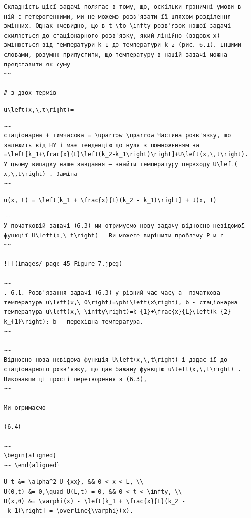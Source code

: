 \documentclass[
  ukrainian,
]{article}
\begin{document}
\begin{verbatim}
Складність цієї задачі полягає в тому, що, оскільки граничні умови в ній є гетерогенними, ми не можемо розв'язати її шляхом розділення змінних. Однак очевидно, що в t \to \infty розв'язок нашої задачі схиляється до стаціонарного розв'язку, який лінійно (вздовж x) змінюється від температури k_1 до температури k_2 (рис. 6.1). Іншими словами, розумно припустити, що температуру в нашій задачі можна представити як суму
~~

# з двох термів
\end{verbatim}

\texttt{u\textbackslash{}left(x,\textbackslash{},t\textbackslash{}right)=}

\begin{verbatim}
~~
стаціонарна + тимчасова = \uparrow \uparrow Частина розв'язку, що залежить від HY і має тенденцію до нуля з помноженням на =\left[k_1+\frac{x}{L}\left(k_2-k_1\right)\right]+U\left(x,\,t\right). У цьому випадку наше завдання — знайти температуру переходу U\left( x,\,t\right) . Заміна
~~
\end{verbatim}

\texttt{u(x,\ t)\ =\ \textbackslash{}left{[}k\_1\ +\ \textbackslash{}frac\{x\}\{L\}(k\_2\ -\ k\_1)\textbackslash{}right{]}\ +\ U(x,\ t)}

\begin{verbatim}
~~
У початковій задачі (6.3) ми отримуємо нову задачу відносно невідомої функції U\left(x,\ t\right) . Ви можете вирішити проблему Р и с
~~

![](images/_page_45_Figure_7.jpeg)

~~
. 6.1. Розв'язання задачі (6.3) у різний час часу a- початкова температура u\left(x,\ 0\right)=\phi\left(x\right); b - стаціонарна температура u\left(x,\ \infty\right)=k_{1}+\frac{x}{L}\left(k_{2}-k_{1}\right); b - перехідна температура.
~~

~~
Відносно нова невідома функція U\left(x,\,t\right) і додає її до стаціонарного розв'язку, що дає бажану функцію u\left(x,\,t\right) . Виконавши ці прості перетворення з (6.3),
~~

Ми отримаємо

(6.4)

~~
\begin{aligned}
~~ \end{aligned}
\end{verbatim}

\texttt{U\_t\ \&=\ \textbackslash{}alpha\^{}2\ U\_\{xx\},\ \&\&\ 0\ \textless{}\ x\ \textless{}\ L,\ \textbackslash{}\textbackslash{}}
\texttt{U(0,t)\ \&=\ 0,\textbackslash{}quad\ U(L,t)\ =\ 0,\ \&\&\ 0\ \textless{}\ t\ \textless{}\ \textbackslash{}infty,\ \textbackslash{}\textbackslash{}}
\texttt{U(x,0)\ \&=\ \textbackslash{}varphi(x)\ -\ \textbackslash{}left{[}k\_1\ +\ \textbackslash{}frac\{x\}\{L\}(k\_2\ -\ k\_1)\textbackslash{}right{]}\ =\ \textbackslash{}overline\{\textbackslash{}varphi\}(x).}
\end{document}
